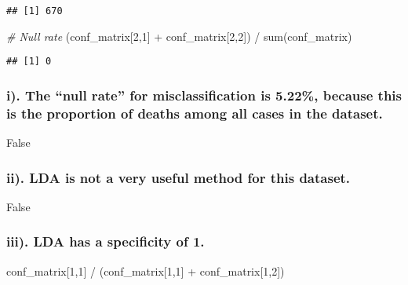 \documentclass[
]{article}
\newenvironment{Shaded}{\begin{snugshade}}{\end{snugshade}}
\newcommand{\CommentTok}[1]{\textcolor[rgb]{0.56,0.35,0.01}{\textit{#1}}}
\newcommand{\DecValTok}[1]{\textcolor[rgb]{0.00,0.00,0.81}{#1}}
\newcommand{\FunctionTok}[1]{\textcolor[rgb]{0.00,0.00,0.00}{#1}}
\newcommand{\NormalTok}[1]{#1}
\newcommand{\SpecialCharTok}[1]{\textcolor[rgb]{0.00,0.00,0.00}{#1}}
\begin{document}
\begin{verbatim}
## [1] 670
\end{verbatim}

\begin{Shaded}
\begin{Highlighting}[]
\CommentTok{\# Null rate}
\NormalTok{(conf\_matrix[}\DecValTok{2}\NormalTok{,}\DecValTok{1}\NormalTok{] }\SpecialCharTok{+}\NormalTok{ conf\_matrix[}\DecValTok{2}\NormalTok{,}\DecValTok{2}\NormalTok{]) }\SpecialCharTok{/} \FunctionTok{sum}\NormalTok{(conf\_matrix) }
\end{Highlighting}
\end{Shaded}

\begin{verbatim}
## [1] 0
\end{verbatim}

\hypertarget{i.-the-null-rate-for-misclassification-is-5.22-because-this-is-the-proportion-of-deaths-among-all-cases-in-the-dataset.}{%
\subsubsection{i). The ``null rate'' for misclassification is 5.22\%,
because this is the proportion of deaths among all cases in the
dataset.}\label{i.-the-null-rate-for-misclassification-is-5.22-because-this-is-the-proportion-of-deaths-among-all-cases-in-the-dataset.}}

False

\hypertarget{ii.-lda-is-not-a-very-useful-method-for-this-dataset.}{%
\subsubsection{ii). LDA is not a very useful method for this
dataset.}\label{ii.-lda-is-not-a-very-useful-method-for-this-dataset.}}

False

\hypertarget{iii.-lda-has-a-specificity-of-1.}{%
\subsubsection{iii). LDA has a specificity of
1.}\label{iii.-lda-has-a-specificity-of-1.}}

\begin{Shaded}
\begin{Highlighting}[]
\NormalTok{conf\_matrix[}\DecValTok{1}\NormalTok{,}\DecValTok{1}\NormalTok{] }\SpecialCharTok{/}\NormalTok{ (conf\_matrix[}\DecValTok{1}\NormalTok{,}\DecValTok{1}\NormalTok{] }\SpecialCharTok{+}\NormalTok{ conf\_matrix[}\DecValTok{1}\NormalTok{,}\DecValTok{2}\NormalTok{])}
\end{Highlighting}
\end{Shaded}
\end{document}
